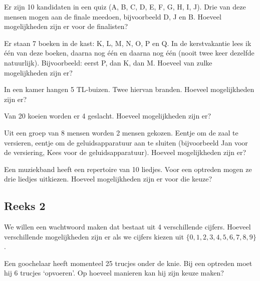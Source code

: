 \documentclass[12pt,twoside]{article}
\begin{document}
\begin{oefening}
Er zijn 10 kandidaten in een quiz (A, B, C, D, E, F, G, H, I, J). Drie van deze mensen mogen aan de finale meedoen, bijvoorbeeld D, J en B. Hoeveel mogelijkheden zijn er voor de finalisten?
\end{oefening}

\begin{oefening}
Er staan 7 boeken in de kast: K, L, M, N, O, P en Q. In de kerstvakantie lees ik één van deze boeken, daarna nog één en daarna nog één (nooit twee keer dezelfde natuurlijk). Bijvoorbeeld: eerst P, dan K, dan M. Hoeveel van zulke mogelijkheden zijn er?
\end{oefening}

\begin{oefening}
In een kamer hangen 5 TL-buizen. Twee hiervan branden. Hoeveel mogelijkheden zijn er?
\end{oefening}

\begin{oefening}
Van 20 koeien worden er 4 geslacht. Hoeveel mogelijkheden zijn er?
\end{oefening}

\begin{oefening}
Uit een groep van 8 mensen worden 2 mensen gekozen. Eentje om de zaal te versieren, eentje om de geluidsapparatuur aan te sluiten (bijvoorbeeld Jan voor de versiering, Kees voor de geluidsapparatuur). Hoeveel mogelijkheden zijn er?
\end{oefening}

\begin{oefening}
Een muziekband heeft een repertoire van 10 liedjes. Voor een optreden mogen ze drie liedjes uitkiezen. Hoeveel mogelijkheden zijn er voor die keuze?
\end{oefening}

\pagebreak
\subsection{Reeks 2}

\begin{oefening}
We willen een wachtwoord maken dat bestaat uit 4 verschillende cijfers. Hoeveel verschillende
mogelijkheden zijn er als we cijfers kiezen uit $\{0,1,2,3,4,5,6,7,8,9\}$.
\end{oefening}

\begin{oefening}
Een goochelaar heeft momenteel 25 trucjes onder de knie. Bij een optreden moet hij 6 trucjes
‘opvoeren’. Op hoeveel manieren kan hij zijn keuze maken?
\end{oefening}
\end{document}
